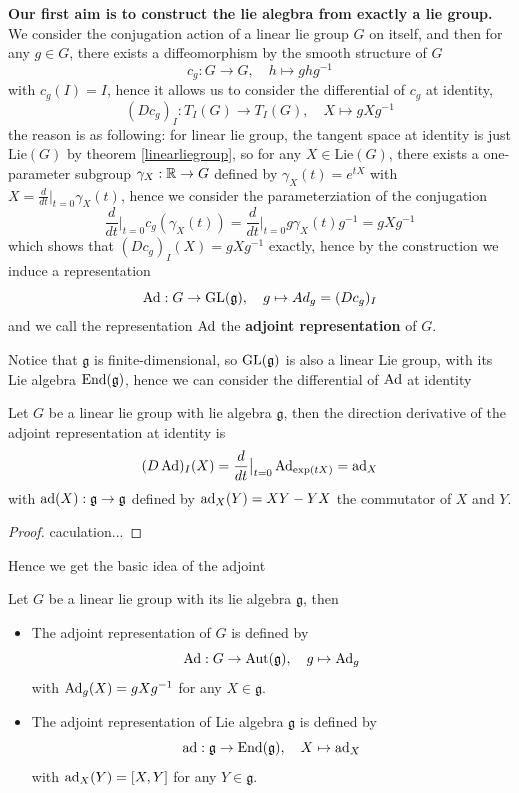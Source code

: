 \textbf{Our first aim is to construct the lie alegbra from exactly a lie group.}\\

We consider the conjugation action of a linear lie group \(G\) on itself, and then for any \(g \in G\), there exists a diffeomorphism by the smooth structure of \(G\)
\[c_g: G \to G, \quad h \mapsto ghg^{-1}\]
with \(c_g(I) = I\), hence it allows us to consider the differential of \(c_g\) at identity,
\[(Dc_g)_I: T_I(G) \to T_I(G), \quad X \mapsto gXg^{-1} \]
the reason is as following: for linear lie group, the tangent space at identity is just \(\mathrm{Lie}(G)\) by theorem \ref{linearliegroup}, so for any \(X \in \mathrm{Lie}(G)\), there exists a one-parameter subgroup \(\gamma_X: \mathbb{R} \to G\) defined by \(\gamma_X(t) = e^{tX}\) with \(X = \frac{d}{dt}\big|_{t=0} \gamma_X(t)\), hence we consider the parameterziation of the conjugation
\[\frac{d}{dt}\big|_{t=0} c_g(\gamma_X(t)) = \frac{d}{dt}\big|_{t=0} g\gamma_X(t)g^{-1} = gXg^{-1}\]
which shows that \((Dc_g)_I(X) = gXg^{-1}\) exactly, hence by the construction we induce a representation
\[\operatorname{Ad}: G \to \operatorname{GL}(\mathfrak{g}), \quad g \mapsto Ad_g = (Dc_g)_I\]
and we call the representation \(\operatorname{Ad}\) the \textbf{adjoint representation} of \(G\).

Notice that \(\mathfrak{g}\) is finite-dimensional, so \(\operatorname{GL}(\mathfrak{g})\) is also a linear Lie group, with its Lie algebra \(\operatorname{End}(\mathfrak{g})\), hence we can consider the differential of \(\operatorname{Ad}\) at identity

\begin{proposition}
    Let \(G\) be a linear lie group with lie algebra \(\mathfrak{g}\), then the direction derivative of the adjoint representation at identity is 
    \[(D\operatorname{Ad})_I(X) = \frac{d}{dt}\big|_{t=0} \operatorname{Ad}_{\exp(tX)} = \operatorname{ad}_X\]
    with \(\operatorname{ad}(X): \mathfrak{g} \to \mathfrak{g}\) defined by \(\operatorname{ad}_X(Y) = XY-YX\) the commutator of \(X\) and \(Y\).
\end{proposition}

\begin{proof}
    caculation...
\end{proof}

Hence we get the basic idea of the adjoint 

\begin{definition}
    Let \(G\) be a linear lie group with its lie algebra \(\mathfrak{g}\), then 
    \begin{itemize}
        \item The adjoint representation of \(G\) is defined by
        \[\operatorname{Ad}: G \to \operatorname{Aut}(\mathfrak{g}), \quad g \mapsto \operatorname{Ad}_g\]
        with \(\operatorname{Ad}_g(X) = gXg^{-1}\) for any \(X \in \mathfrak{g}\).\\
        \item The adjoint representation of Lie algebra \(\mathfrak{g}\) is defined by
        \[\operatorname{ad}: \mathfrak{g} \to \operatorname{End}(\mathfrak{g}), \quad X \mapsto \operatorname{ad}_X\]
        with \(\operatorname{ad}_X(Y) = [X,Y]\) for any \(Y \in \mathfrak{g}\).
    \end{itemize}
\end{definition}

